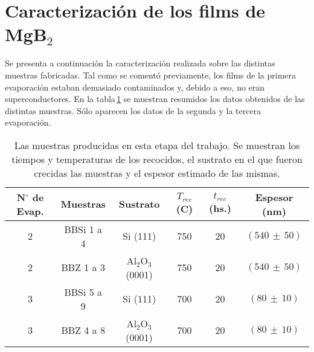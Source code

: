 \section{Caracterización de los films de MgB$_2$}\label{S:evapcarac}
Se presenta a continuación la caracterización realizada sobre las distintas muestras fabricadas. Tal como se comentó previamente, los films de la primera evaporación estaban demasiado contaminados y, debido a eso, no eran superconductores. En la tabla\,\ref{tab:muestras} se muestran resumidos los datos obtenidos de las distintas muestras. Sólo aparecen los datos de la segunda y la tercera evaporación.
\begin{table}[h!]
\centering
\begin{tabular}{|c|c|c|c|c|c|} \hline
  N$^{\circ}$ de Evap.& Muestras & Sustrato & $T_{rec}$(C) & $t_{rec}$(hs.) & Espesor (nm) \\ \hline
2 & BBSi 1 a 4&Si (111)&750&20&$(540 \, \pm \, 50)$ \\
2 & BBZ 1 a 3&Al$_2$O$_3$ (0001)&750&20&$(540 \, \pm \, 50)$  \\ \hline
3 & BBSi 5 a 9&Si (111)&700&20&$(80 \, \pm \, 10)$ \\
3 & BBZ 4 a 8&Al$_2$O$_3$ (0001)&700&20&$(80 \, \pm \, 10)$\\ \hline
\end{tabular}
\caption[Las muestras producidas por medio del método de evaporación y recocido.]{Las muestras producidas en esta etapa del trabajo. Se muestran los tiempos y temperaturas de los recocidos,
el sustrato en el que fueron crecidas las muestras y el espesor estimado de las mismas.}
\label{tab:muestras}
\end{table} 

